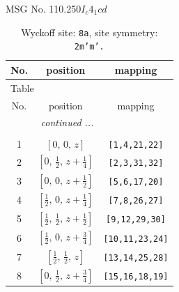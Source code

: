 \documentclass[fleqn,8pt]{jsarticle}
\begin{document}
\setcounter{MaxMatrixCols}{32}

\renewcommand{\tablename}{Table~}
\renewcommand{\figurename}{Figure~}
\begin{center}
\LARGE
MSG No. 110.250\quad$I_{c}4_{1}cd$
\end{center}
\renewcommand{\arraystretch}{1.2}
\begin{longtable}{ccc}
\caption{Wyckoff site: {\tt 8a}, site symmetry: {\tt 2m'm'.}}
 \\
 \hline \hline
No. & position & mapping \\ \hline \endfirsthead

\multicolumn{2}{l}{\tablename\ \thetable{}} \\
 \hline \hline
No. & position & mapping \\ \hline \endhead

 \hline \hline
\multicolumn{2}{r}{\footnotesize\it continued ...} \\ \endfoot

 \hline \hline
\multicolumn{2}{r}{} \\ \endlastfoot

1 & $\left[ 0,\, 0,\, z \right]$ & {\tt [1,4,21,22]} \\ \hline
2 & $\left[ 0,\, \frac{1}{2},\, z + \frac{1}{4} \right]$ & {\tt [2,3,31,32]} \\ \hline
3 & $\left[ 0,\, 0,\, z + \frac{1}{2} \right]$ & {\tt [5,6,17,20]} \\ \hline
4 & $\left[ \frac{1}{2},\, 0,\, z + \frac{1}{4} \right]$ & {\tt [7,8,26,27]} \\ \hline
5 & $\left[ \frac{1}{2},\, \frac{1}{2},\, z + \frac{1}{2} \right]$ & {\tt [9,12,29,30]} \\ \hline
6 & $\left[ \frac{1}{2},\, 0,\, z + \frac{3}{4} \right]$ & {\tt [10,11,23,24]} \\ \hline
7 & $\left[ \frac{1}{2},\, \frac{1}{2},\, z \right]$ & {\tt [13,14,25,28]} \\ \hline
8 & $\left[ 0,\, \frac{1}{2},\, z + \frac{3}{4} \right]$ & {\tt [15,16,18,19]} \\
\end{longtable}
\renewcommand{\arraystretch}{1.2}
\end{document}

